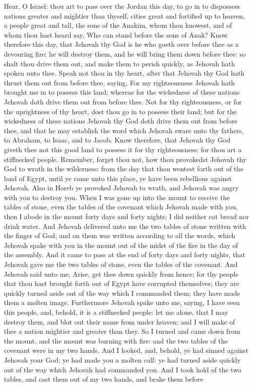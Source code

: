 Hear, O Israel: thou art to pass over the Jordan this day, to go in to dispossess nations greater and mightier than thyself, cities great and fortified up to heaven, a people great and tall, the sons of the Anakim, whom thou knowest, and of whom thou hast heard say, Who can stand before the sons of Anak? Know therefore this day, that Jehovah thy God is he who goeth over before thee as a devouring fire; he will destroy them, and he will bring them down before thee: so shalt thou drive them out, and make them to perish quickly, as Jehovah hath spoken unto thee. Speak not thou in thy heart, after that Jehovah thy God hath thrust them out from before thee, saying, For my righteousness Jehovah hath brought me in to possess this land; whereas for the wickedness of these nations Jehovah doth drive them out from before thee. Not for thy righteousness, or for the uprightness of thy heart, dost thou go in to possess their land; but for the wickedness of these nations Jehovah thy God doth drive them out from before thee, and that he may establish the word which Jehovah sware unto thy fathers, to Abraham, to Isaac, and to Jacob.  Know therefore, that Jehovah thy God giveth thee not this good land to possess it for thy righteousness; for thou art a stiffnecked people. Remember, forget thou not, how thou provokedst Jehovah thy God to wrath in the wilderness: from the day that thou wentest forth out of the land of Egypt, until ye came unto this place, ye have been rebellious against Jehovah. Also in Horeb ye provoked Jehovah to wrath, and Jehovah was angry with you to destroy you. When I was gone up into the mount to receive the tables of stone, even the tables of the covenant which Jehovah made with you, then I abode in the mount forty days and forty nights; I did neither eat bread nor drink water. And Jehovah delivered unto me the two tables of stone written with the finger of God; and on them was written according to all the words, which Jehovah spake with you in the mount out of the midst of the fire in the day of the assembly. And it came to pass at the end of forty days and forty nights, that Jehovah gave me the two tables of stone, even the tables of the covenant. And Jehovah said unto me, Arise, get thee down quickly from hence; for thy people that thou hast brought forth out of Egypt have corrupted themselves; they are quickly turned aside out of the way which I commanded them; they have made them a molten image. Furthermore Jehovah spake unto me, saying, I have seen this people, and, behold, it is a stiffnecked people: let me alone, that I may destroy them, and blot out their name from under heaven; and I will make of thee a nation mightier and greater than they. So I turned and came down from the mount, and the mount was burning with fire: and the two tables of the covenant were in my two hands. And I looked, and, behold, ye had sinned against Jehovah your God; ye had made you a molten calf: ye had turned aside quickly out of the way which Jehovah had commanded you. And I took hold of the two tables, and cast them out of my two hands, and brake them before 